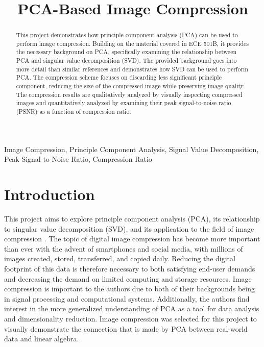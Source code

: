 \documentclass[conference]{IEEEtran}
\title{PCA-Based Image Compression}
\author{
\IEEEauthorblockN{Owen Sowatzke}
\IEEEauthorblockA{\textit{Electrical Engineering Department} \\
\textit{University of Arizona}\\
Tucson, USA \\
osowatzke@arizona.edu}
\and
\IEEEauthorblockN{Scott Thoesen}
\IEEEauthorblockA{\textit{Electrical Engineering Department} \\
\textit{University of Arizona}\\
Tucson, USA \\
thoesens@arizona.edu}}
\begin{document}
    
	\maketitle
	\begin{abstract}
		This project demonstrates how principle component analysis (PCA) can be used to perform image compression. Building on the material covered in ECE 501B, it provides the necessary background on PCA, specifically examining the relationship between PCA and singular value decomposition (SVD). The provided background goes into more detail than similar references and demonstrates how SVD can be used to perform PCA. The compression scheme focuses on discarding less significant principle component, reducing the size of the compressed image while preserving image quality. The compression results are qualitatively analyzed by visually inspecting compressed images and quantitatively analyzed by examining their peak signal-to-noise ratio (PSNR) as a function of compression ratio.   
	\end{abstract}

	\begin{IEEEkeywords}
		Image Compression, Principle Component Analysis, Signal Value Decomposition, Peak Signal-to-Noise Ratio, Compression Ratio
	\end{IEEEkeywords}

    \section{Introduction}
    This project aims to explore principle component analysis (PCA), its relationship to singular value decomposition (SVD), and its application to the field of image compression \cite{jaradet_svd_image_compression}. The topic of digital image compression has become more important than ever with the advent of smartphones and social media, with millions of images created, stored, transferred, and copied daily. Reducing the digital footprint of this data is therefore necessary to both satisfying end-user demands and decreasing the demand on limited computing and storage resources. Image compression is important to the authors due to both of their backgrounds being in signal processing and computational systems. Additionally, the authors find interest in the more generalized understanding of PCA as a tool for data analysis and dimensionality reduction. Image compression was selected for this project to visually demonstrate the connection that is made by PCA between real-world data and linear algebra.
\end{document}
